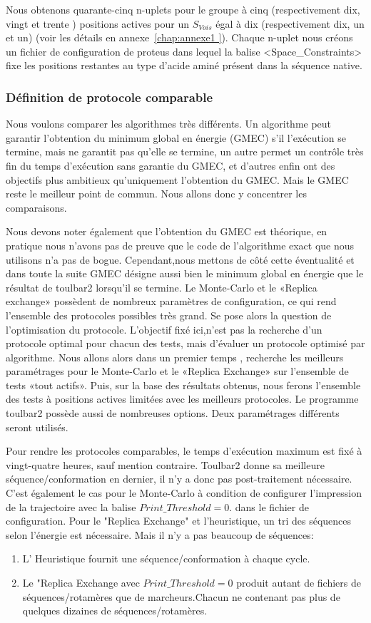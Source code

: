 Nous obtenons quarante-cinq n-uplets pour le groupe à cinq (respectivement dix, vingt et trente ) positions actives pour un $S_{Vois}$ égal à dix (respectivement dix, un et un) (voir les détails en annexe~\ref{chap:annexe1 }). Chaque n-uplet nous créons un fichier de configuration de proteus dans lequel la balise <Space\_Constraints> fixe les positions restantes au type d'acide aminé présent dans la séquence native. 


\subsubsection{Définition de protocole comparable}
\label{sec:proto_compa}
Nous voulons comparer les algorithmes très différents. Un algorithme peut garantir l'obtention du minimum global en énergie (GMEC) s'il l'exécution se termine, mais ne garantit pas qu'elle se termine, un autre permet un contrôle très fin du temps d'exécution sans garantie du GMEC, et d'autres enfin ont des objectifs plus ambitieux  qu'uniquement l'obtention du GMEC.
Mais le GMEC reste le meilleur point de commun. Nous allons donc y concentrer les comparaisons.

Nous devons noter également que l'obtention du GMEC est théorique, en pratique nous n'avons pas de preuve que le code de l'algorithme exact que nous utilisons n'a pas de bogue. Cependant,nous mettons de côté cette éventualité et dans toute la suite GMEC désigne aussi bien le minimum global en énergie que le résultat de toulbar2 lorsqu'il se termine.  
Le Monte-Carlo et le «Replica exchange» possèdent de nombreux paramètres de configuration, ce qui rend l'ensemble des protocoles possibles très grand. Se pose alors la question de l'optimisation du protocole. L'objectif fixé ici,n'est pas la recherche d'un protocole optimal pour chacun des tests, mais d'évaluer un protocole optimisé par algorithme.
Nous allons alors dans un premier temps , recherche les meilleurs paramétrages pour le Monte-Carlo et le «Replica Exchange» sur l'ensemble de tests «tout actifs».
Puis, sur la base des résultats obtenus, nous ferons l'ensemble des tests à positions actives limitées avec les meilleurs protocoles.
Le programme toulbar2 possède aussi de nombreuses options. Deux paramétrages différents seront utilisés.


Pour rendre les protocoles comparables, le temps d'exécution maximum est fixé à vingt-quatre heures, sauf mention contraire.
Toulbar2 donne sa meilleure séquence/conformation en dernier, il n'y a donc pas post-traitement nécessaire.
C'est également le cas pour le Monte-Carlo à condition de configurer l'impression de la trajectoire avec la balise $Print\_Threshold=0$. dans le fichier de configuration.
Pour le "Replica Exchange" et l'heuristique, un tri des séquences selon l'énergie est nécessaire. Mais il n'y a pas beaucoup de séquences: 
\begin{enumerate}
\item L' Heuristique fournit une séquence/conformation à chaque cycle.
\item Le "Replica Exchange avec $Print\_Threshold=0$ produit autant de fichiers de séquences/rotamères que de marcheurs.Chacun ne contenant pas plus de quelques dizaines de séquences/rotamères. 
\end{enumerate}

